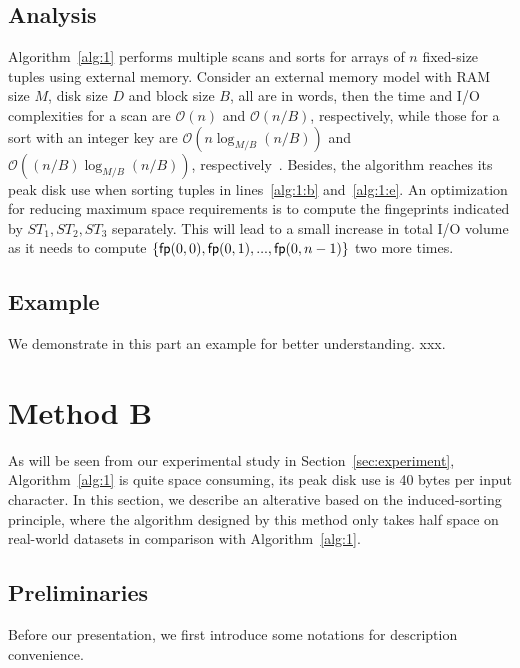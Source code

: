 \documentclass[10pt,journal,compsoc]{IEEEtran}
\begin{document}
\subsection{Analysis} \label{sec:method1:analysis}

Algorithm~\ref{alg:1} performs multiple scans and sorts for arrays of $n$ fixed-size tuples using external memory. Consider an external memory model with RAM size $M$, disk size $D$ and block size $B$, all are in words, then the time and I/O complexities for a scan are $\mathcal{O}(n)$ and $\mathcal{O}(n / B)$, respectively, while those for a sort with an integer key are $\mathcal{O}(n\log_{M/ B}(n / B))$ and $\mathcal{O}((n / B)\log_{M / B}(n / B))$, respectively~\cite{Arge2013}. Besides, the algorithm reaches its peak disk use when sorting tuples in lines~\ref{alg:1:b} and~\ref{alg:1:e}. An optimization for reducing maximum space requirements is to compute the fingeprints indicated by $ST_1, ST_2, ST_3$ separately. This will lead to a small increase in total I/O volume as it needs to compute $\{{\sf fp}(0, 0), {\sf fp}(0, 1), ..., {\sf fp}(0, n - 1)\}$ two more times.

	
\subsection{Example} \label{sec:method1:example}

We demonstrate in this part an example for better understanding. xxx.
	
	
\section{Method B} \label{sec:method2}

As will be seen from our experimental study in Section~\ref{sec:experiment}, Algorithm~\ref{alg:1} is quite space consuming, its peak disk use is 40 bytes per input character. In this section, we describe an alterative based on the induced-sorting principle, where the algorithm designed by this method only takes half space on real-world datasets in comparison with Algorithm~\ref{alg:1}.

\subsection{Preliminaries} \label{sec:method2:preliminaries}

Before our presentation, we first introduce some notations for description convenience.
\end{document}
